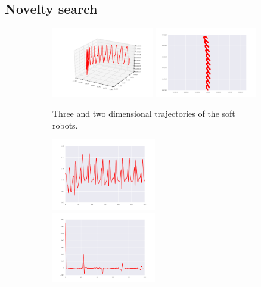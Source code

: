 \documentclass{sig-alternate}
\begin{document}
\subsection{Novelty search}

\begin{figure}[t!]
\centering
\begin{subfigure}[b]{0.47\textwidth}
\centering
\includegraphics[width=0.49\textwidth]{../Figures/Behaviors/3d.pdf}
\includegraphics[width=0.49\textwidth]{../Figures/Behaviors/2d.pdf}
\caption{Three and two dimensional trajectories of the soft robots.}
\end{subfigure}
\begin{subfigure}[b]{0.23\textwidth}
\centering
\includegraphics[width=0.5\textwidth]{../Figures/Behaviors/pace.pdf}~
\includegraphics[width=0.5\textwidth]{../Figures/Behaviors/pacedft.pdf}

\end{subfigure}
\end{figure}
\end{document}
